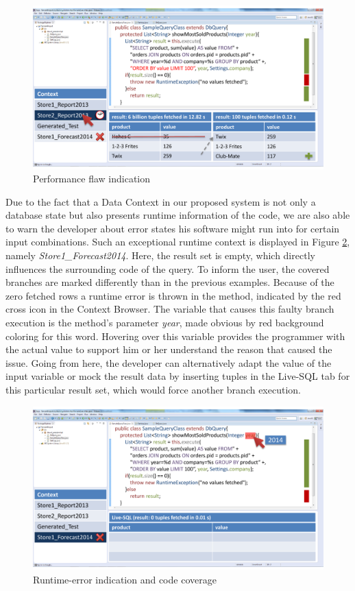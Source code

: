\begin{figure}
\begin{centering}
    \includegraphics[width=1.0\linewidth]{images/slow}
    \caption{Performance flaw indication}
    \label{fig:final_prototype_slow}
\end{centering}
\end{figure}
Due to the fact that a Data Context in our proposed system is not only a database state but also presents runtime information of the code, we are also able to warn the developer about error states his software might run into for certain input combinations. Such an exceptional runtime context is displayed in Figure \ref{fig:final_prototype_error}, namely \emph{Store1\_Forecast2014}. Here, the result set is empty, which directly influences the surrounding code of the query. To inform the user, the covered branches are marked differently than in the previous examples. Because of the zero fetched rows a runtime error is thrown in the method, indicated by the red cross icon in the Context Browser. The variable that causes this faulty branch execution is the method's parameter \emph{year}, made obvious by red background coloring for this word. Hovering over this variable provides the programmer with the actual value to support him or her understand the reason that caused the issue. Going from here, the developer can alternatively adapt the value of the input variable or mock the result data by inserting tuples in the Live-SQL tab for this particular result set, which would force another branch execution.\\
\begin{figure}
\begin{centering}
    \includegraphics[width=1.0\linewidth]{images/error}
    \caption{Runtime-error indication and code coverage}
    \label{fig:final_prototype_error}
\end{centering}
\end{figure}